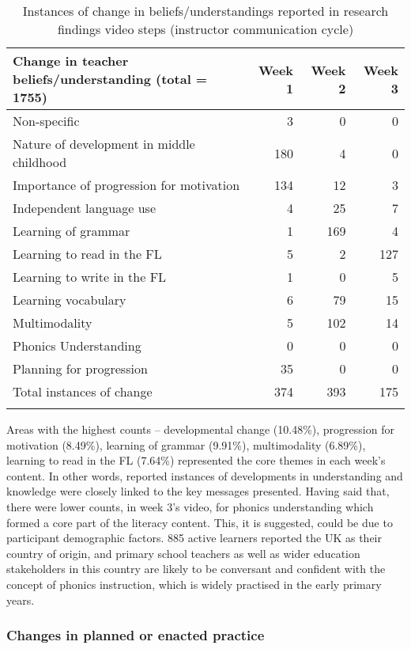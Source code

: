 \documentclass[output=paper]{langscibook}
\begin{document}
\begin{table}
\begin{tabularx}{\textwidth}{Qrrr}
\lsptoprule
{Change in teacher beliefs/understanding (total = 1755)} & {Week 1} & {Week 2} & {Week 3}\\
\midrule
Non-specific & 3 & 0 & 0\\
Nature of development in middle childhood & 180 & 4 & 0\\
Importance of progression for motivation & 134 & 12 & 3\\
Independent language use & 4 & 25 & 7\\
Learning of grammar & 1 & 169 & 4\\
Learning to read in the FL & 5 & 2 & 127\\
Learning to write in the FL & 1 & 0 & 5\\
Learning vocabulary & 6 & 79 & 15\\
Multimodality & 5 & 102 & 14\\
Phonics Understanding & 0 & 0 & 0\\
Planning for progression & 35 & 0 & 0\\
\midrule
Total instances of change & 374 & 393 & 175\\
\lspbottomrule
\end{tabularx}
\caption{Instances of change in beliefs/understandings reported in research findings video steps (instructor communication cycle)}
\label{tab:porter:6}
\end{table}

Areas with the highest counts – developmental change (10.48\%), progression for motivation (8.49\%), learning of grammar (9.91\%), multimodality (6.89\%), learning to read in the FL (7.64\%) represented the core themes in each week’s content. In other words, reported instances of developments in understanding and knowledge were closely linked to the key messages presented. Having said that, there were lower counts, in week 3’s video, for phonics understanding which formed a core part of the literacy content. This, it is suggested, could be due to participant demographic factors. 885 active learners reported the UK as their country of origin, and primary school teachers as well as wider education stakeholders in this country are likely to be conversant and confident with the concept of phonics instruction, which is widely practised in the early primary years. 

\subsubsection{Changes in planned or enacted practice}\label{sec:porter:3.1.2}
\end{document}
